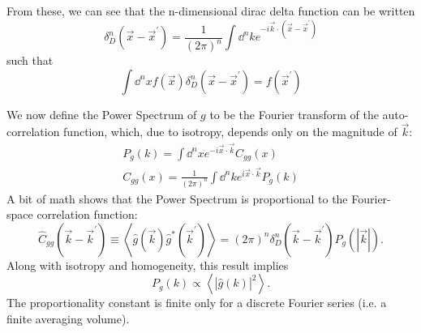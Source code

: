 From these, we can see that the n-dimensional dirac delta 
function can be written
\begin{equation}
  \label{ddelta_form}
  \delta^n_D(\vec x-\vec x^\prime) = \frac{1}{(2\pi)^n}\int \dd^nke^{-i\vec k\cdot(\vec x-\vec x^\prime)}
\end{equation}
such that 
\begin{equation}
  \label{ddelta_def}
  \int \dd^nx f(\vec x)\delta^n_D(\vec x-\vec x^\prime) = f(\vec x^\prime)
\end{equation}

We now define the Power Spectrum of $g$ to be the Fourier transform of the 
auto-correlation function, which, due to isotropy, depends only on the 
magnitude of $\vec k$:
\begin{eqnarray}
  \label{pspec}
  P_g(k) = \int \dd^nx e^{-i\vec x\cdot\vec k}C_{gg}(x)\nonumber\\
  C_{gg}(x) = \frac{1}{(2\pi)^n}\int\dd^nke^{i\vec x\cdot\vec k}P_g(k)
\end{eqnarray}
A bit of math shows that the Power Spectrum is proportional to the 
Fourier-space correlation function:
\begin{equation}
  \label{pspec_corr}
  \hat C_{gg}(\vec k-\vec k^\prime) 
  \equiv \left\langle\hat g(\vec k)\hat g^*(\vec k^\prime) \right\rangle 
  =  (2\pi)^n \delta^n_D(\vec k -\vec k^\prime) P_g(|\vec k|).
\end{equation}
Along with isotropy and homogeneity, this result implies
\begin{equation}
  P_g(k) \propto \left\langle | \hat g(k)|^2 \right\rangle.
\end{equation}
The proportionality constant is finite only for a discrete Fourier series 
(i.e. a finite averaging volume).

